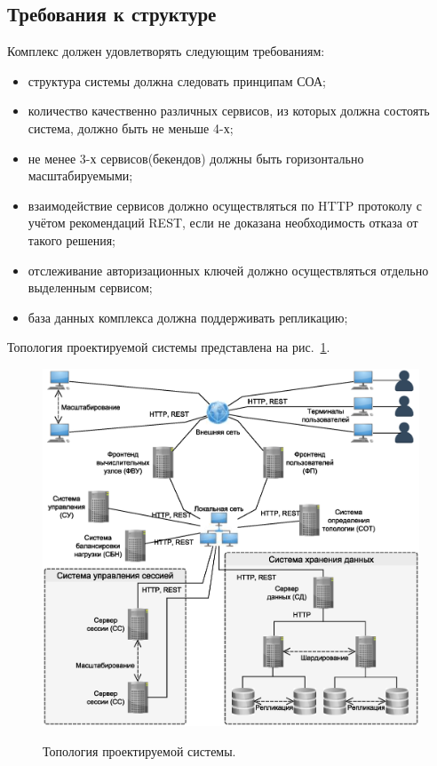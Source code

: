 \documentclass[a4paper,12pt]{report}
\numberwithin{equation}{section}
\begin{document}
\subsection{Требования к структуре}
Комплекс должен удовлетворять следующим требованиям:
\begin{itemize}
  \item структура системы должна следовать принципам СОА;
  \item количество качественно различных сервисов, из которых должна состоять система, должно быть не меньше 4-х;
  \item не менее 3-х сервисов(бекендов) должны быть горизонтально масштабируемыми;
  \item взаимодействие сервисов должно осуществляться по HTTP протоколу с учётом рекомендаций REST, если не доказана необходимость отказа от такого решения;
  \item отслеживание авторизационных ключей должно осуществляться отдельно выделенным сервисом;
  \item база данных комплекса должна поддерживать репликацию; 
\end{itemize}

Топология проектируемой системы представлена на рис.~\ref{fig:topology}.

\begin{figure}
    \includegraphics[width=\linewidth]{img/schema-tz.eps}
    \label{fig:topology}
    \caption{Топология проектируемой системы.}
\end{figure}
\end{document}
